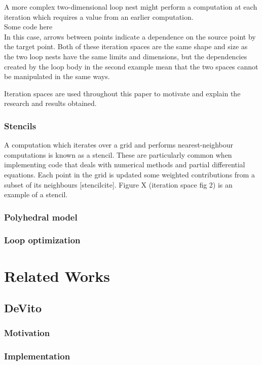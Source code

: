 \documentclass[a4paper,12pt,twoside]{report}
\begin{document}
A more complex two-dimensional loop nest might perform a computation at each iteration which requires a value from an earlier
computation.
\\ Some code here \\
In this case, arrows between points indicate a dependence on the source point by the target point. Both of these iteration 
spaces are the same shape and size as the two loop nests have the same limits and dimensions, but the
dependencies created by the loop body in the second example mean that the two spaces cannot be manipulated in the same ways.

Iteration spaces are used throughout this paper to motivate and explain the research and results obtained.

\subsubsection{Stencils}
A computation which iterates over a grid and performs nearest-neighbour computations is known as a stencil. These are
particularly common when implementing code that deals with numerical methods and partial differential equations.
Each point in the grid is updated some weighted contributions from a subset of its neighbours [stencilcite]. Figure X (iteration
space fig 2) is an example of a stencil.

\subsubsection{Polyhedral model}

\subsubsection{Loop optimization}

\section{Related Works}
\subsection{DeVito}
\subsubsection{Motivation}
\subsubsection{Implementation}
\end{document}
